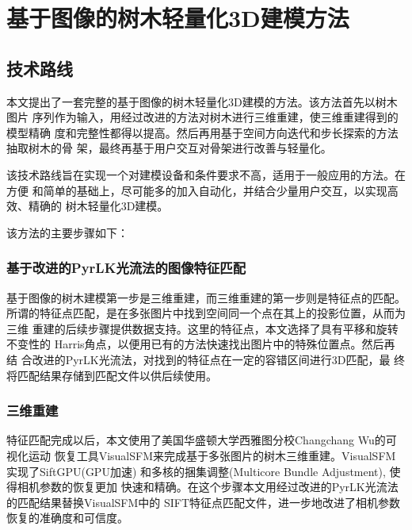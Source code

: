 
\chapter{基于图像的树木轻量化3D建模方法}
\label{cha:techroute}

\section{技术路线}
\label{sec:techroute}
本文提出了一套完整的基于图像的树木轻量化3D建模的方法。该方法首先以树木图片
序列作为输入，用经过改进的方法对树木进行三维重建，使三维重建得到的模型精确
度和完整性都得以提高。然后再用基于空间方向迭代和步长探索的方法抽取树木的骨
架，最终再基于用户交互对骨架进行改善与轻量化。

该技术路线旨在实现一个对建模设备和条件要求不高，适用于一般应用的方法。在方便
和简单的基础上，尽可能多的加入自动化，并结合少量用户交互，以实现高效、精确的
树木轻量化3D建模。

该方法的主要步骤如下：

\subsection{基于改进的PyrLK光流法的图像特征匹配}
\label{subsec:match}
基于图像的树木建模第一步是三维重建，而三维重建的第一步则是特征点的匹配。
所谓的特征点匹配，是在多张图片中找到空间同一个点在其上的投影位置，从而为三维
重建的后续步骤提供数据支持。这里的特征点，本文选择了具有平移和旋转不变性的
Harris角点\cite{harris}，以便用已有的方法快速找出图片中的特殊位置点。然后再结
合改进的PyrLK光流法\cite{pyrlk}，对找到的特征点在一定的容错区间进行3D匹配，最
终将匹配结果存储到匹配文件以供后续使用。

\subsection{三维重建}
\label{subsec:calibration}
特征匹配完成以后，本文使用了美国华盛顿大学西雅图分校Changchang Wu的可视化运动
恢复工具VisualSFM来完成基于多张图片的树木三维重建。VisualSFM实现了SiftGPU(GPU加速)
和多核的捆集调整(Multicore Bundle Adjustment), 使得相机参数的恢复更加
快速和精确。在这个步骤本文用经过改进的PyrLK光流法的匹配结果替换VisualSFM中的
SIFT特征点匹配文件，进一步地改进了相机参数恢复的准确度和可信度。



